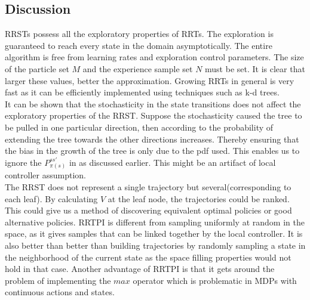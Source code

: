\documentclass[wcp]{jmlr}
\begin{document}
\subsection*{Discussion}
RRSTs possess  all the exploratory properties of RRTs. The exploration is guaranteed to reach every state in the domain asymptotically. The entire algorithm is free from learning rates and exploration control parameters. The size of the particle set $M$ and the experience sample set $N$ must be set. It is clear that larger these values, better the approximation. Growing RRTs in general is very fast as it can be efficiently implemented using techniques such as k-d trees.\\
It can be shown that the stochasticity in the state transitions does not affect the exploratory properties of the RRST. Suppose the stochasticity caused the tree to be pulled in one particular direction, then according to  the probability of extending the tree towards the other directions increases. Thereby ensuring that the bias in the growth of the tree is only due to the pdf used. This enables us to ignore the $P^{ss'}_{\pi(s)}$ in  as discussed earlier. This might be an artifact of local controller assumption.\\
The RRST does not represent a single trajectory but several(corresponding to each leaf). By calculating $V$ at the leaf node, the trajectories could be ranked. This could give us a method of discovering equivalent optimal policies or good alternative policies. RRTPI is different from sampling uniformly at random in the space, as it gives samples that can be linked together by the local controller. It is also better than better than building trajectories by randomly sampling a state in the neighborhood of the current state as the space filling properties would not hold in that case. Another advantage of RRTPI is that it gets around the problem of implementing the $max$ operator which is problematic in MDPs with continuous actions and states.\\
\end{document}
